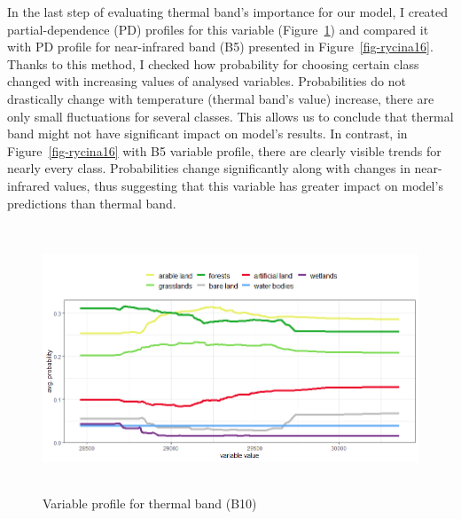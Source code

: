 \documentclass{amuthesis}
\begin{document}
In the last step of evaluating thermal band's importance for our model,
I created partial-dependence (PD) profiles for this variable
(Figure~\ref{fig-rycina15}) and compared it with PD profile for
near-infrared band (B5) presented in Figure~\ref{fig-rycina16}. Thanks
to this method, I checked how probability for choosing certain class
changed with increasing values of analysed variables. Probabilities do
not drastically change with temperature (thermal band's value) increase,
there are only small fluctuations for several classes. This allows us to
conclude that thermal band might not have significant impact on model's
results. In contrast, in Figure~\ref{fig-rycina16} with B5 variable
profile, there are clearly visible trends for nearly every class.
Probabilities change significantly along with changes in near-infrared
values, thus suggesting that this variable has greater impact on model's
predictions than thermal band.

\begin{figure}[H]

{\centering \includegraphics[width=5.90625in,height=3.125in]{./figures/profB10.png}

}

\caption{\label{fig-rycina15}Variable profile for thermal band (B10)}

\end{figure}
\end{document}
